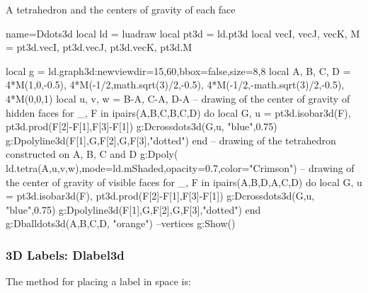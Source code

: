 \begin{demo}{A tetrahedron and the centers of gravity of each face}
\begin{luadraw}{name=Ddots3d}
local ld = luadraw
local pt3d = ld.pt3d
local vecI, vecJ, vecK, M = pt3d.vecI, pt3d.vecJ, pt3d.vecK, pt3d.M

local g = ld.graph3d:new{viewdir={15,60},bbox=false,size={8,8}}
local A, B, C, D = 4*M(1,0,-0.5), 4*M(-1/2,math.sqrt(3)/2,-0.5), 4*M(-1/2,-math.sqrt(3)/2,-0.5), 4*M(0,0,1)
local u, v, w = B-A, C-A, D-A
-- drawing of the center of gravity of hidden faces
for _, F in ipairs({{A,B,C},{B,C,D}}) do
local G, u = pt3d.isobar3d(F), pt3d.prod(F[2]-F[1],F[3]-F[1])
g:Dcrossdots3d({G,u}, "blue",0.75)
g:Dpolyline3d({{F[1],G,F[2]},{G,F[3]}},"dotted")
end
-- drawing of the tetrahedron constructed on A, B, C and D
g:Dpoly( ld.tetra(A,u,v,w),{mode=ld.mShaded,opacity=0.7,color="Crimson"})
-- drawing of the center of gravity of visible faces
for _, F in ipairs({{A,B,D},{A,C,D}}) do
    local G, u = pt3d.isobar3d(F), pt3d.prod(F[2]-F[1],F[3]-F[1])
    g:Dcrossdots3d({G,u}, "blue",0.75)
    g:Dpolyline3d({{F[1],G,F[2]},{G,F[3]}},"dotted")
end
g:Dballdots3d({A,B,C,D}, "orange") --vertices
g:Show()
\end{luadraw}
\end{demo}

\subsubsection{3D Labels: Dlabel3d}

The method for placing a label in space is:


